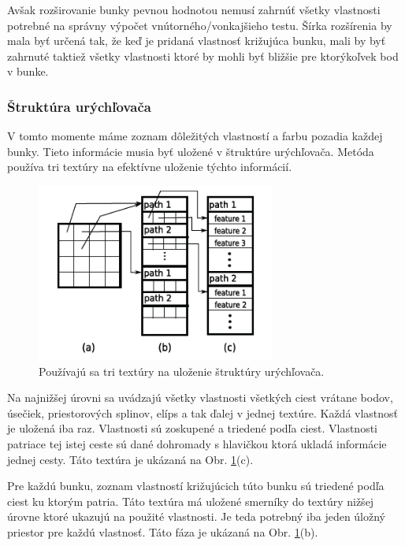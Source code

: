 Avšak rozširovanie bunky pevnou hodnotou nemusí zahrnúť všetky vlastnosti potrebné na správny výpočet vnútorného/vonkajšieho testu. Šírka rozšírenia by mala byť určená tak, že keď je pridaná vlastnosť križujúca bunku, mali by byť zahrnuté taktiež všetky vlastnosti ktoré by mohli byť bližšie pre ktorýkoľvek bod v bunke.

\subsubsection{Štruktúra urýchľovača}

V tomto momente máme zoznam dôležitých vlastností a farbu pozadia každej bunky. Tieto informácie musia byť uložené v štruktúre urýchľovača. Metóda používa tri textúry na efektívne uloženie týchto informácií.

\begin{figure}[H]
\begin{center}
\includegraphics[width=0.7\textwidth]{images/acceleration_structure_1}
\caption{Používajú sa tri textúry na uloženie štruktúry urýchľovača. \cite{qmk08}}
\label{img:acceleration_structure_1}
\end{center}
\end{figure}

Na najnižšej úrovni sa uvádzajú všetky vlastnosti všetkých ciest vrátane bodov, úsečiek, priestorových splinov, elíps a tak ďalej v jednej textúre. Každá vlastnosť je uložená iba raz. Vlastnosti sú zoskupené a triedené podľa ciest. Vlastnosti patriace tej istej ceste sú dané dohromady s hlavičkou ktorá ukladá informácie jednej cesty. Táto textúra je ukázaná na Obr. \ref{img:acceleration_structure_1}(c).

Pre každú bunku, zoznam vlastností križujúcich túto bunku sú triedené podľa ciest ku ktorým patria. Táto textúra má uložené smerníky do textúry nižšej úrovne ktoré ukazujú na použité vlastnosti. Je teda potrebný iba jeden úložný priestor pre každú vlastnosť. Táto fáza je ukázaná na Obr. \ref{img:acceleration_structure_1}(b).

